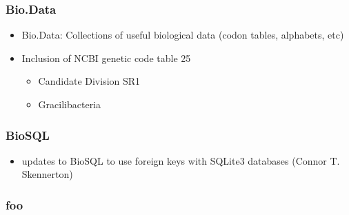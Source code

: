\documentclass[trans]{beamer}
\begin{document}
\frame
{
  \frametitle{Bio.Data}
  
  \begin{itemize}
  \item Bio.Data: Collections of useful biological data (codon tables, alphabets, etc)
  \item Inclusion of NCBI genetic code table 25
  \begin{itemize}
  \item Candidate Division SR1
  \item Gracilibacteria
  \end{itemize}
  \end{itemize}
}

\frame
{
  \frametitle{BioSQL}
  
  \begin{itemize}
  \item updates to BioSQL to use foreign keys with SQLite3 databases (Connor T. Skennerton)
  \end{itemize}

}

\frame
{
  \frametitle{foo}
}
\end{document}
